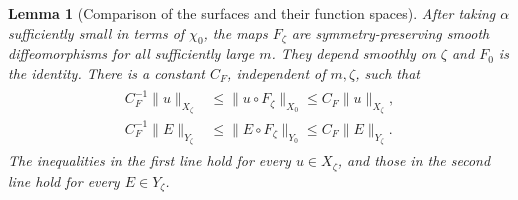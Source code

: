 \documentclass[a4paper,11pt,oneside,reqno]{amsart}
\numberwithin{equation}{section}
\newtheorem{lemma}[theorem]{Lemma}
\theoremstyle{definition}
\begin{document}
\begin{lemma}[Comparison of the surfaces and their function spaces]
    \label{lem:s4-identifications}
    After taking $\alpha$ sufficiently small in terms of
    $\chi_0$, the maps $F_\zeta$ are symmetry-preserving smooth
    diffeomorphisms for all sufficiently large $m$. They depend
    smoothly on $\zeta$ and $F_0$ is the identity. There is a
    constant $C_F$, independent of $m,\zeta$, such that
    \begin{align}
        \label{eq:s4-norm-identification}
        \begin{split}
            C_F^{-1}\|u\|_{X_\zeta}
            &\leq\|u\circ F_\zeta\|_{X_0}
            \leq C_F\|u\|_{X_\zeta},\\
            C_F^{-1}\|E\|_{Y_\zeta}
            &\leq\|E\circ F_\zeta\|_{Y_0}
            \leq C_F\|E\|_{Y_\zeta}.
        \end{split}
    \end{align}
    The inequalities in the first line hold for every
    $u\in X_\zeta$, and those in the second line hold
    for every $E\in Y_\zeta$.
\end{lemma}
\end{document}
